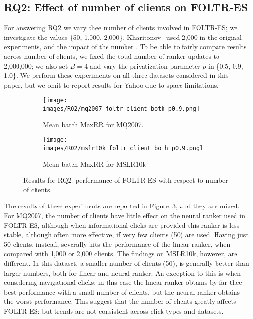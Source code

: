 \subsection{RQ2: Effect of number of clients on FOLTR-ES}

For answering RQ2 we vary thee number of clients involved in FOLTR-ES; we investigate the values \{50, 1,000, 2,000\}. Kharitonov~\cite{kharitonov2019federated} used 2,000 in the original experiments, and the impact of the number . To be able to fairly compare results across number of clients, we fixed the total number of ranker updates to 2,000,000; we also set $B = 4$ and vary the privatization parameter $p$ in \{0.5, 0.9, 1.0\}. We perform these experiments on all three datasets considered in this paper, but we omit to report results for Yahoo due to space limitations. 


\begin{figure}[t]
	\centering
	\begin{subfigure}{1\textwidth}
		\texttt{[image: images/RQ2/mq2007\_foltr\_client\_both\_p0.9.png]}
		\caption{Mean batch MaxRR for MQ2007.}
		\label{fig:mq2007-rq2}
	\end{subfigure}
	\begin{subfigure}{1\textwidth}
		\texttt{[image: images/RQ2/mslr10k\_foltr\_client\_both\_p0.9.png]}
		\caption{Mean batch MaxRR for MSLR10k}
		\label{fig:mslr10k-rq2}
	\end{subfigure}
	\caption{Results for RQ2: performance of FOLTR-ES with respect to number of clients. \label{fig:RQ2}} 
\end{figure}


The results of these experiments are reported in Figure~\ref{fig:RQ2}, and they are mixed. For MQ2007, the number of clients have little effect on the neural ranker used in FOLTR-ES, although when informational clicks are provided this ranker is less stable, although often more effective, if very few clients (50) are used. Having just 50 clients, instead, severally hits the performance of the linear ranker, when compared with 1,000 or 2,000 clients. The findings on MSLR10k, however, are different. In this dataset, a smaller number of clients (50), is generally better than larger numbers, both for linear and neural ranker. An exception to this is when considering navigational clicks: in this case the linear ranker obtains by far thee best performance with a small number of clients, but the neural ranker obtains the worst performance. This suggest that the number of clients greatly affects FOLTR-ES: but trends are not consistent across click types and datasets. 


